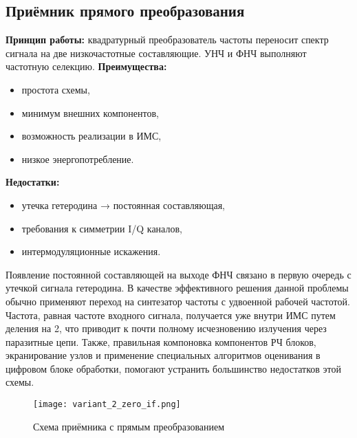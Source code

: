\documentclass[a4paper,12pt]{article}
\begin{document}
\subsection{Приёмник прямого преобразования}
\textbf{Принцип работы:} \newline
квадратурный преобразователь частоты переносит спектр сигнала на две низкочастотные составляющие. УНЧ и ФНЧ выполняют частотную селекцию.   
\newline
\newline
\textbf{Преимущества:}
\begin{itemize}
    \item простота схемы,
    \item минимум внешних компонентов,
    \item возможность реализации в ИМС,
    \item низкое энергопотребление.
\end{itemize}
\textbf{Недостатки:}
\begin{itemize}
    \item утечка гетеродина → постоянная составляющая,
    \item требования к симметрии I/Q каналов,
    \item интермодуляционные искажения.
\end{itemize}
Появление постоянной составляющей на выходе ФНЧ связано в первую очередь с утечкой сигнала гетеродина. В качестве эффективного решения данной проблемы обычно применяют переход на синтезатор частоты с удвоенной рабочей частотой. Частота, равная частоте входного сигнала, получается уже внутри ИМС путем деления на 2, что приводит к почти полному исчезновению излучения через паразитные цепи. Также, правильная компоновка компонентов РЧ блоков, экранирование узлов и применение специальных алгоритмов оценивания в цифровом блоке обработки, помогают устранить большинство недостатков этой схемы.

\begin{figure}[H]
    \centering
    \texttt{[image: variant\_2\_zero\_if.png]}
    \caption{Схема приёмника с прямым преобразованием}
    \label{fig:enter-label}
\end{figure}
\end{document}
